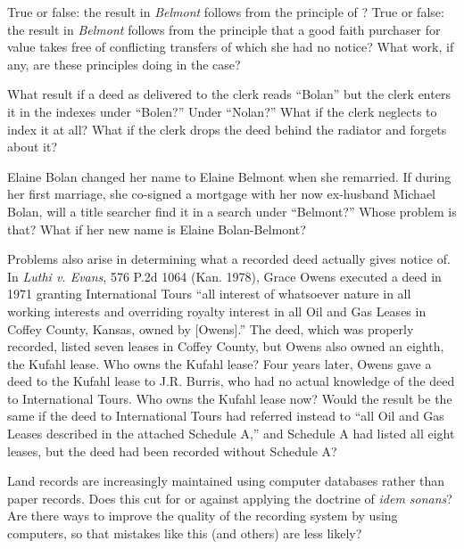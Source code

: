 
\item True or false: the result in \textit{Belmont} follows from the principle
of \textit{}? True or false: the result in \textit{Belmont}
follows
from the principle that a good faith purchaser for value takes free of
conflicting transfers of which she had no notice? What work, if any, are these
principles doing in the case?


\item What result if a deed as delivered to the clerk reads ``Bolan'' but the
clerk enters it in the indexes under ``Bolen?'' Under ``Nolan?'' What if the
clerk neglects to index it at all? What if the clerk drops the deed behind the
radiator and forgets about it?


\item Elaine Bolan changed her name to Elaine Belmont when she remarried. If
during her first marriage, she co-signed a mortgage with her now ex-husband
Michael Bolan, will a title searcher find it in a search under ``Belmont?''
Whose problem is that? What if her new name is Elaine Bolan-Belmont?


\item Problems also arise in determining what a recorded deed actually gives
notice of. In \textit{Luthi v. Evans}, 576 P.2d 1064 (Kan. 1978), Grace Owens
executed a deed in 1971 granting International Tours {}``all interest of
whatsoever nature in all working interests and overriding royalty interest in
all Oil and Gas Leases in Coffey County, Kansas, owned by [Owens].'' The deed,
which was properly recorded, listed seven leases in Coffey County, but Owens
also owned an eighth, the Kufahl lease. Who owns the Kufahl lease? Four years
later, Owens gave a deed to the Kufahl lease to J.R. Burris, who had no actual
knowledge of the deed to International Tours. Who owns the Kufahl lease now?
Would the result be the same if the deed to International Tours had referred
instead to ``all Oil and Gas Leases described in the attached Schedule A,'' and
Schedule A had listed all eight leases, but the deed had been recorded without
Schedule A?


\item Land records are increasingly maintained using computer databases rather
than paper records. Does this cut for or against applying the doctrine of
\textit{idem sonans}? Are there ways to improve the quality of the recording
system by using computers, so that mistakes like this (and others) are less
likely?


